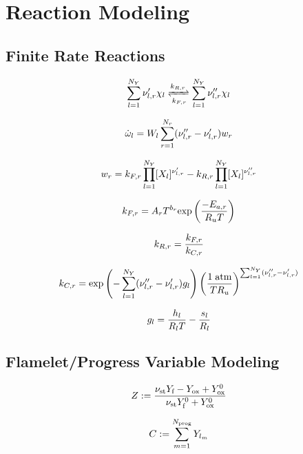 \section{Reaction Modeling}

\subsection{Finite Rate Reactions}\label{sec:finiterate}

\begin{equation}
	\specSumAll \stoichCoefSpecReac' \chi_\specIdx \xrightleftharpoons[\forwardRateReac]{\reverseRateReac} \specSumAll \stoichCoefSpecReac'' \chi_\specIdx
\end{equation}

\begin{equation}
	\dot{\omega}_{l} = W_{l} \sum_{r = 1}^{N_r} (\nu_{l,r}'' - \nu_{l,r}') w_{r}
\end{equation}

\begin{equation}
	w_{r} = k_{F,r} \prod_{l=1}^{N_Y} [X_{l}]^{\nu_{l,r}'} - k_{R,r} \prod_{l=1}^{N_Y} [X_{l}]^{\nu_{l,r}''}
\end{equation}

\begin{equation}
	k_{F,r} = A_{r} T^{b_{r}} \text{exp} \left( \frac{-E_{a,r}}{R_u T} \right)
\end{equation}

\begin{equation}
	k_{R,r} = \frac{k_{F,r}}{k_{C,r}}
\end{equation}

\begin{equation}
	k_{C,r} = \text{exp}\left(-\sum_{l = 1}^{N_Y} (\nu_{l,r}'' - \nu_{l,r}') g_{l}\right) \left(\frac{1 \; \text{atm}}{T R_u}\right)^{\sum_{l = 1}^{N_Y} (\nu_{l,r}'' - \nu_{l,r}')}
\end{equation}

\begin{equation}\label{eq:gibbsSpec}
	g_{l} = \frac{h_{l}}{R_{l} T} - \frac{s_{l}}{R_{l}}
\end{equation}

\subsection{Flamelet/Progress Variable Modeling}\label{sec:fpv}

\begin{equation}\label{eq:mixFracDef}
    Z := \frac{ \nu_{\text{st}} Y_{\text{f}} - Y_{\text{ox}} + Y^0_{\text{ox}} }{ \nu_{\text{st}} Y^0_{\text{f}} + Y^0_{\text{ox}} }
\end{equation}

\begin{equation}\label{eq:progVarDef}
	C := \sum_{m = 1}^{N_{\text{prog}}} Y_{l_{m}}
\end{equation}
